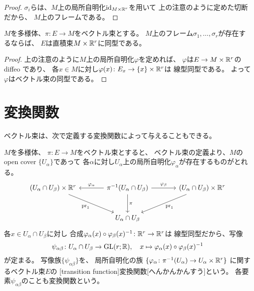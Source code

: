 \documentclass[report]{jlreq}
\begin{document}
\begin{proof}
    $\sigma_i$らは、$M$上の局所自明化$\mathrm{id}_{M \times \mathbb{R}^r}$を用いて
    上の注意のように定めた切断だから、
    $M$上のフレームである。
\end{proof}

\begin{proposition}[フレームがあれば直積束]
    $M$を多様体、$\pi \colon E \to M$をベクトル束とする。
    $M$上のフレーム$\sigma_1, \dots, \sigma_r$が存在するならば、
    $E$は直積束$M \times \mathbb{R}^r$に同型である。
\end{proposition}

\begin{proof}
    上の注意のように$M$上の局所自明化$\varphi$を定めれば、
    $\varphi$は$E \to M \times \mathbb{R}^r$の diffeo であり、
    各$x \in M$に対し$\varphi(x) \colon E_x \to \{x\} \times \mathbb{R}^r$は
    線型同型である。
    よって$\varphi$はベクトル束の同型である。
\end{proof}


%
\section{変換関数}

ベクトル束は、次で定義する変換関数によって与えることもできる。

\begin{definition}[変換関数]
    $M$を多様体、
    $\pi \colon E \to M$をベクトル束とすると、
    ベクトル束の定義より、$M$の open cover $\{U_\alpha\}$であって
    各$\alpha$に対し$U_\alpha$上の局所自明化$\varphi_\alpha$が存在するものがとれる。
    \begin{equation}
        \begin{tikzcd}[column sep=large, row sep=large]
            (U_\alpha \cap U_\beta) \times \R^r \ar{rd}[swap]{\mathrm{pr}_1}
                & \pi^{-1}(U_\alpha \cap U_\beta)
                    \ar{l}[swap]{\varphi_\alpha} \ar{d}{\pi} \ar{r}{\varphi_\beta}
                & (U_\alpha \cap U_\beta) \times \R^r \ar{ld}{\mathrm{pr}_1} \\
            & U_\alpha \cap U_\beta
        \end{tikzcd}
    \end{equation}
    各$x \in U_\alpha \cap U_\beta$に対し
    合成$\varphi_\alpha(x) \circ \varphi_\beta(x)^{-1} \colon \mathbb{R}^r \to \mathbb{R}^r$は
    線型同型だから、{\smooth}写像
    \begin{equation}
        \psi_{\alpha\beta} \colon U_\alpha \cap U_\beta \to \operatorname{\mathrm{GL}}(r; \mathbb{R}),
        \quad
        x \mapsto \varphi_\alpha(x) \circ \varphi_\beta(x)^{-1}
    \end{equation}
    が定まる。
    写像族$\{ \psi_{\alpha\beta} \}$を、
    局所自明化の族
    $\{ \varphi_\alpha \colon \pi^{-1}(U_\alpha) \to U_\alpha \times \mathbb{R}^r \}$
    に関するベクトル束$E$の
    [transition function]{変換関数}[へんかんかんすう]という。
    各要素$\psi_{\alpha\beta}$のことも変換関数という。
\end{definition}
\end{document}
